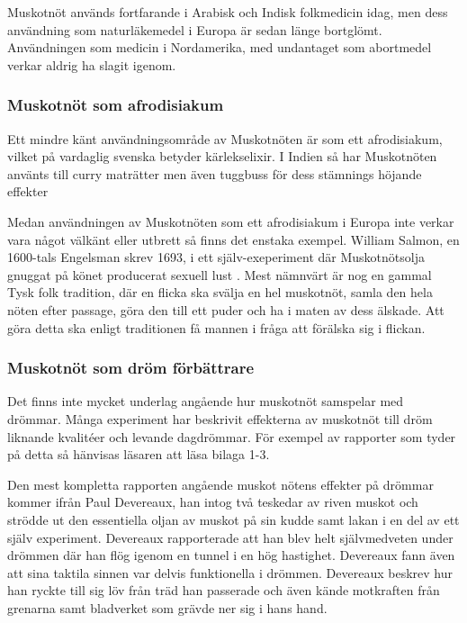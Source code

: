 Muskotnöt används fortfarande i Arabisk och Indisk folkmedicin idag, men dess användning som naturläkemedel i Europa är sedan länge bortglömt.
Användningen som medicin i Nordamerika, med undantaget som abortmedel verkar aldrig ha slagit igenom.


\subsubsection{Muskotnöt som afrodisiakum}

Ett mindre känt användningsområde av Muskotnöten är som ett afrodisiakum, vilket på vardaglig svenska betyder
kärlekselixir.
I Indien så har Muskotnöten använts till curry maträtter men även tuggbuss för dess stämnings höjande effekter \cite{ratsch2005encyclopedia}

Medan användningen av Muskotnöten som ett afrodisiakum i Europa inte verkar vara något välkänt eller utbrett så
finns det enstaka exempel. William Salmon, en 1600-tals Engelsman skrev 1693, i ett själv-exeperiment där
Muskotnötsolja gnuggat på könet producerat sexuell lust \cite{RudgleyR}.
Mest nämnvärt är nog en gammal Tysk folk tradition, där en flicka ska svälja en hel muskotnöt, samla den hela nöten
efter passage, göra den till ett puder och ha i maten av dess älskade. Att göra detta ska enligt traditionen
få mannen i fråga att förälska sig i flickan. \cite{ratsch2005encyclopedia}



\subsubsection{Muskotnöt som dröm förbättrare}

Det finns inte mycket underlag angående hur muskotnöt samspelar med drömmar. Många experiment har beskrivit effekterna
av muskotnöt till dröm liknande kvalitéer och levande dagdrömmar. \cite{entheogenreview}
För exempel av rapporter som tyder på detta så hänvisas läsaren att läsa bilaga 1-3.

Den mest kompletta rapporten angående muskot nötens effekter på drömmar kommer ifrån Paul Devereaux, han intog
två teskedar av riven muskot och strödde ut den essentiella oljan av muskot på sin kudde samt lakan i en del
av ett själv experiment. Devereaux rapporterade att han blev helt självmedveten under drömmen där han flög igenom
en tunnel i en hög hastighet. Devereaux fann även att sina taktila sinnen var delvis funktionella i drömmen.
Devereaux beskrev hur han ryckte till sig löv från träd han passerade och även kände motkraften från grenarna samt
bladverket som grävde ner sig i hans hand. \cite{RudgleyR}

